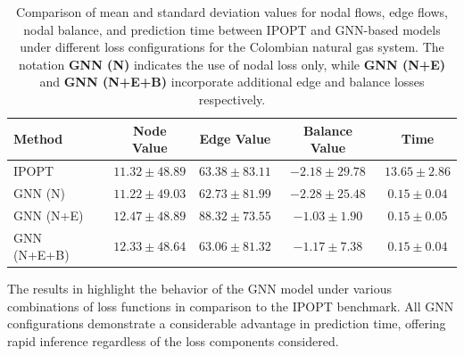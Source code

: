 %
%
%
%


\begin{table}[htbp]
\centering
\begin{tabular}{|l|c|c|c|c|}
    \hline
    Method & Node Value & Edge Value & Balance Value & Time \\ \hline
    IPOPT & \( 11.32 \pm 48.89 \) & \( 63.38 \pm 83.11 \) & \( -2.18 \pm 29.78 \) & \( 13.65 \pm 2.86 \) \\ \hline
    GNN (N) & \( 11.22 \pm 49.03 \) & \( 62.73 \pm 81.99 \) & \( -2.28 \pm 25.48 \) & \( 0.15 \pm 0.04 \) \\ \hline
    GNN (N+E) & \( 12.47 \pm 48.89 \) & \( 88.32 \pm 73.55 \) & \( -1.03 \pm 1.90 \) & \( 0.15 \pm 0.05 \) \\ \hline
    GNN (N+E+B) & \( 12.33 \pm 48.64 \) & \( 63.06 \pm 81.32 \) & \( -1.17 \pm 7.38 \) & \( 0.15 \pm 0.04 \) \\ \hline
\end{tabular}
\caption{Comparison of mean and standard deviation values for nodal flows, edge flows, nodal balance, and prediction time between IPOPT and GNN-based models under different loss configurations for the Colombian natural gas system. The notation \textbf{GNN (N)} indicates the use of nodal loss only, while \textbf{GNN (N+E)} and \textbf{GNN (N+E+B)} incorporate additional edge and balance losses respectively.}
\label{tab:base_nl_dummy_results_formatted}
\end{table}

The results in  highlight the behavior of the GNN model under various combinations of loss functions in comparison to the IPOPT benchmark. All GNN configurations demonstrate a considerable advantage in prediction time, offering rapid inference regardless of the loss components considered.


